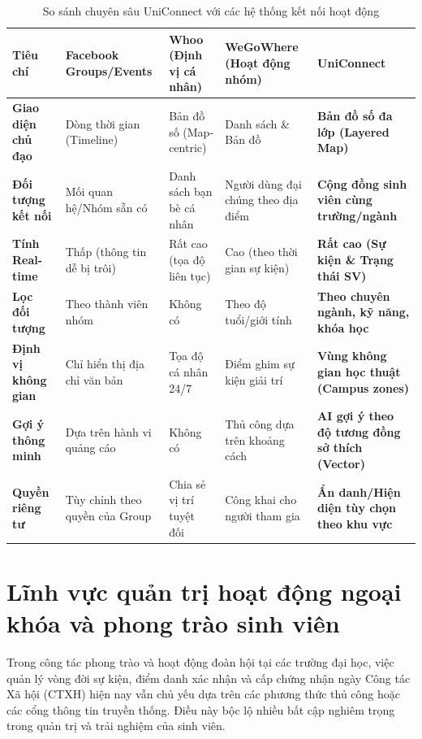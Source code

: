 \begin{table}[htbp]
\centering
\caption{So sánh chuyên sâu UniConnect với các hệ thống kết nối hoạt động}
\label{tab:so-sanh-hoat-dong-chi-tiet}
\small
\begin{tabular}{|l|>{\raggedright\arraybackslash}p{2.3cm}|>{\raggedright\arraybackslash}p{2.3cm}|>{\raggedright\arraybackslash}p{2.3cm}|>{\raggedright\arraybackslash}p{2.8cm}|}
\hline
\textbf{Tiêu chí} & \textbf{Facebook Groups/Events} & \textbf{Whoo (Định vị cá nhân)} & \textbf{WeGoWhere (Hoạt động nhóm)} & \textbf{UniConnect} \\ \hline
\textbf{Giao diện chủ đạo} & Dòng thời gian (Timeline) & Bản đồ số (Map-centric) & Danh sách \& Bản đồ & \textbf{Bản đồ số đa lớp (Layered Map)} \\ \hline
\textbf{Đối tượng kết nối} & Mối quan hệ/Nhóm sẵn có & Danh sách bạn bè cá nhân & Người dùng đại chúng theo địa điểm & \textbf{Cộng đồng sinh viên cùng trường/ngành} \\ \hline
\textbf{Tính Real-time} & Thấp (thông tin dễ bị trôi) & Rất cao (tọa độ liên tục) & Cao (theo thời gian sự kiện) & \textbf{Rất cao (Sự kiện \& Trạng thái SV)} \\ \hline
\textbf{Lọc đối tượng} & Theo thành viên nhóm & Không có & Theo độ tuổi/giới tính & \textbf{Theo chuyên ngành, kỹ năng, khóa học} \\ \hline
\textbf{Định vị không gian} & Chỉ hiển thị địa chỉ văn bản & Tọa độ cá nhân 24/7 & Điểm ghim sự kiện giải trí & \textbf{Vùng không gian học thuật (Campus zones)} \\ \hline
\textbf{Gợi ý thông minh} & Dựa trên hành vi quảng cáo & Không có & Thủ công dựa trên khoảng cách & \textbf{AI gợi ý theo độ tương đồng sở thích (Vector)} \\ \hline
\textbf{Quyền riêng tư} & Tùy chỉnh theo quyền của Group & Chia sẻ vị trí tuyệt đối & Công khai cho người tham gia & \textbf{Ẩn danh/Hiện diện tùy chọn theo khu vực} \\ \hline
\end{tabular}
\end{table}

\section{Lĩnh vực quản trị hoạt động ngoại khóa và phong trào sinh viên}

Trong công tác phong trào và hoạt động đoàn hội tại các trường đại học, việc quản lý vòng đời sự kiện, điểm danh xác nhận và cấp chứng nhận ngày Công tác Xã hội (CTXH) hiện nay vẫn chủ yếu dựa trên các phương thức thủ công hoặc các cổng thông tin truyền thống. Điều này bộc lộ nhiều bất cập nghiêm trọng trong quản trị và trải nghiệm của sinh viên.

